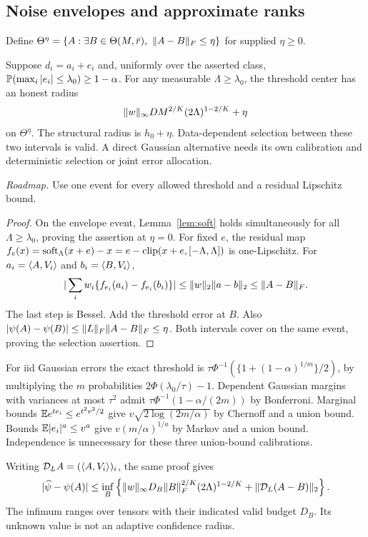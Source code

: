 \subsection{Noise envelopes and approximate ranks}
Define $\Theta^\eta=\{A:\exists B\in\Theta(M,\bar r),\ \lVert A-B\rVert_F\le\eta\}$ for supplied $\eta\ge0$.
\begin{proposition}\label{prop:envelope}
Suppose $d_i=a_i+e_i$ and, uniformly over the asserted class,
$\mathbb P(\max_i|e_i|\le\lambda_0)\ge1-\alpha$.
For any measurable $\Lambda\ge\lambda_0$, the threshold center has an honest radius
\[
 \lVert w\rVert_\infty D M^{2/K}(2\Lambda)^{1-2/K}+\eta
\]
on $\Theta^\eta$. The structural radius is $h_0+\eta$.
Data-dependent selection between these two intervals is valid.
A direct Gaussian alternative needs its own calibration and deterministic selection or joint error allocation.
\end{proposition}
\noindent\emph{Roadmap.} Use one event for every allowed threshold and a residual Lipschitz bound.
\begin{proof}
On the envelope event, Lemma~\ref{lem:soft} holds simultaneously for all $\Lambda\ge\lambda_0$, proving the assertion at $\eta=0$.
For fixed $e$, the residual map
$f_e(x)=\operatorname{soft}_\Lambda(x+e)-x=e-\operatorname{clip}(x+e,[-\Lambda,\Lambda])$
is one-Lipschitz. For $a_i=\langle A,V_i\rangle$ and $b_i=\langle B,V_i\rangle$,
\[
 |\sum_iw_i\{f_{e_i}(a_i)-f_{e_i}(b_i)\}|
 \le\lVert w\rVert_2\lVert a-b\rVert_2\le\lVert A-B\rVert_F.
\]
The last step is Bessel. Add the threshold error at $B$.
Also $|\psi(A)-\psi(B)|\le\lVert L\rVert_F\lVert A-B\rVert_F\le\eta$.
Both intervals cover on the same event, proving the selection assertion.
\end{proof}
For iid Gaussian errors the exact threshold is
$\tau\Phi^{-1}(\{1+(1-\alpha)^{1/m}\}/2)$,
by multiplying the $m$ probabilities $2\Phi(\lambda_0/\tau)-1$.
Dependent Gaussian margins with variances at most $\tau^2$ admit
$\tau\Phi^{-1}(1-\alpha/(2m))$ by Bonferroni.
Marginal bounds $\mathbb E e^{te_i}\le e^{t^2v^2/2}$ give
$v\sqrt{2\log(2m/\alpha)}$ by Chernoff and a union bound.
Bounds $\mathbb E|e_i|^a\le v^a$ give $v(m/\alpha)^{1/a}$ by Markov and a union bound.
Independence is unnecessary for these three union-bound calibrations.

Writing $\mathcal D_L A=(\langle A,V_i\rangle)_i$, the same proof gives
\[
 |\widehat\psi-\psi(A)|\le\inf_B\left\{
 \lVert w\rVert_\infty D_B\lVert B\rVert_F^{2/K}(2\Lambda)^{1-2/K}
 +\lVert \mathcal D_L(A-B)\rVert_2\right\}.
\]
The infimum ranges over tensors with their indicated valid budget $D_B$.
Its unknown value is not an adaptive confidence radius.

